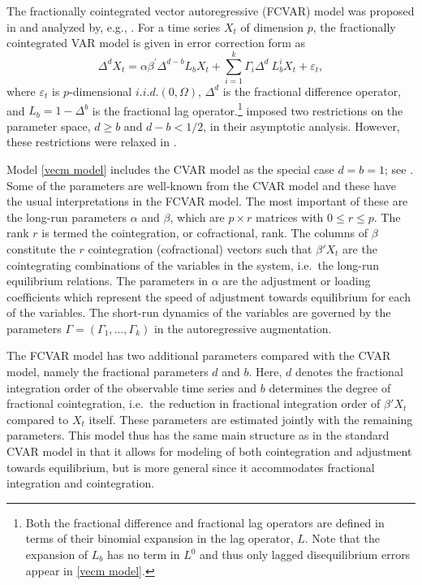 \documentclass[article]{jss}
\begin{document}
The fractionally cointegrated vector autoregressive (FCVAR) model was proposed in \cite{Johansen2008} and analyzed by, e.g., \cite{johniel2010,johansen2012likelihood}. For a time series $X_{t}$ of dimension $p$, the fractionally cointegrated VAR model is given in error correction form as
\begin{equation}
\Delta^{d}X_{t}= \alpha \beta^{\prime} \Delta^{d-b} L_{b} X_{t} + 
\sum_{i=1}^{k}\Gamma_{i}\Delta^{d}\ L_{b}^{i}X_{t}
+ \varepsilon_{t},
\label{vecm model}%
\end{equation}
where $\varepsilon_{t}$ is $p$-dimensional $i.i.d.(0,\Omega)$, $\Delta^{d}$ is the fractional difference operator, and $L_{b}=1-\Delta^{b}$ is the fractional lag operator.\footnote{Both the fractional difference and fractional lag operators are defined in terms of their binomial expansion in the lag operator, $L$. Note that the expansion of $L_{b}$ has no term in $L^{0}$ and thus only lagged disequilibrium errors appear in \eqref{vecm model}.} \cite{johansen2012likelihood} imposed two restrictions on the parameter space, $d\geq b$ and $d-b<1/2$, in their asymptotic analysis. However, these restrictions were relaxed in \cite{JN2018b,JN2018}.

Model \eqref{vecm model} includes the \cite{Johansen1995} CVAR model as the special case $d=b=1$; see \cite{JN2018}. Some of the parameters are well-known from the CVAR model and these have the usual interpretations in the FCVAR model. The most important of these are the long-run parameters $\alpha$ and $\beta$, which are $p \times r$ matrices with $0 \leq r \leq p$. The rank $r$ is termed the cointegration, or cofractional, rank. The columns of $\beta$ constitute the $r$ cointegration (cofractional) vectors such that $\beta' X_t$ are the cointegrating combinations of the variables in the system, i.e.\ the long-run equilibrium relations. The parameters in $\alpha$ are the adjustment or loading coefficients which represent the speed of adjustment towards equilibrium for each of the variables. The short-run dynamics of the variables are governed by the parameters $\Gamma=(\Gamma _{1},\ldots ,\Gamma _{k})$ in the autoregressive augmentation.

The FCVAR model has two additional parameters compared with the CVAR model, namely the fractional parameters $d$ and $b$. Here, $d$ denotes the fractional integration order of the observable time series and $b$ determines the degree of fractional cointegration, i.e.\ the reduction in fractional integration order of $\beta'X_t$ compared to $X_t$ itself. These parameters are estimated jointly with the remaining parameters. This model thus has the same main structure as in the standard CVAR model in that it allows for modeling of both cointegration and adjustment towards equilibrium, but is more general since it accommodates fractional integration and cointegration.
\end{document}
